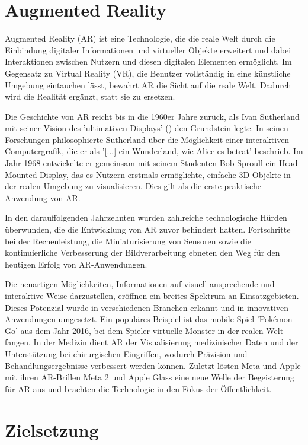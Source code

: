 \section{Augmented Reality}

Augmented Reality (AR) ist eine Technologie, die die reale Welt durch die Einbindung digitaler Informationen und virtueller Objekte erweitert und dabei Interaktionen zwischen Nutzern und diesen digitalen Elementen ermöglicht. Im Gegensatz zu Virtual Reality (VR), die Benutzer vollständig in eine künstliche Umgebung eintauchen lässt, bewahrt AR die Sicht auf die reale Welt. Dadurch wird die Realität ergänzt, statt sie zu ersetzen. \cite{Azuma.1997}

Die Geschichte von AR reicht bis in die 1960er Jahre zurück, als Ivan Sutherland mit seiner Vision des 'ultimativen Displays' (\citet{Sutherland.1965}) den Grundstein legte. In seinen Forschungen philosophierte Sutherland über die Möglichkeit einer interaktiven Computergrafik, die er als '[...] ein Wunderland, wie Alice es betrat' beschrieb. Im Jahr 1968 entwickelte er gemeinsam mit seinem Studenten Bob Sproull ein Head-Mounted-Display, das es Nutzern erstmals ermöglichte, einfache 3D-Objekte in der realen Umgebung zu visualisieren. Dies gilt als die erste praktische Anwendung von AR. \cite{Sutherland.1968}

In den darauffolgenden Jahrzehnten wurden zahlreiche technologische Hürden überwunden, die die Entwicklung von AR zuvor behindert hatten. Fortschritte bei der Rechenleistung, die Miniaturisierung von Sensoren sowie die kontinuierliche Verbesserung der Bildverarbeitung ebneten den Weg für den heutigen Erfolg von AR-Anwendungen.

Die neuartigen Möglichkeiten, Informationen auf visuell ansprechende und interaktive Weise darzustellen, eröffnen ein breites Spektrum an Einsatzgebieten. Dieses Potenzial wurde in verschiedenen Branchen erkannt und in innovativen Anwendungen umgesetzt. Ein populäres Beispiel ist das mobile Spiel 'Pokémon Go' aus dem Jahr 2016, bei dem Spieler virtuelle Monster in der realen Welt fangen. In der Medizin dient AR der Visualisierung medizinischer Daten und der Unterstützung bei chirurgischen Eingriffen, wodurch Präzision und Behandlungsergebnisse verbessert werden können. Zuletzt lösten Meta und Apple mit ihren AR-Brillen Meta 2 und Apple Glass eine neue Welle der Begeisterung für AR aus und brachten die Technologie in den Fokus der Öffentlichkeit.

\section{Zielsetzung}

